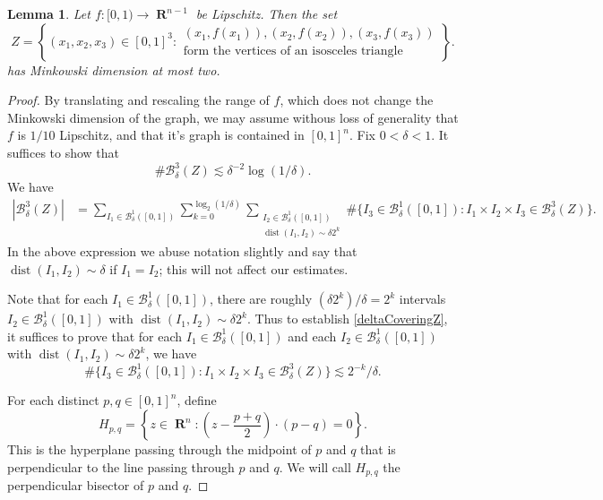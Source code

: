 \documentclass[dvipsnames,letterpaper,12pt]{article}
\numberwithin{equation}{section}
\theoremstyle{plain}
\newtheorem{lemma}{Lemma}
\theoremstyle{remark}
\DeclareMathOperator{\RR}{\mathbf{R}}
\begin{document}
\begin{lemma}
	Let $f\colon [0,1) \to \RR^{n-1}$ be Lipschitz. Then the set
	\[ Z = \left\{ (x_1,x_2,x_3) \in [0,1]^3\colon \begin{array}{c} (x_1,f(x_1)), (x_2,f(x_2)), (x_3,f(x_3))\\
		\textrm{form the vertices of an isosceles triangle} \end{array} \right\}. \]
	has Minkowski dimension at most two.
\end{lemma}
\begin{proof}
By translating and rescaling the range of $f$, which does not change the Minkowski dimension of the graph, we may assume withous loss of generality that $f$ is $1/10$ Lipschitz, and that it's graph is contained in $[0,1]^n$. Fix $0<\delta<1$. It suffices to show that
	\begin{equation}\label{deltaCoveringZ}
		\# \mathcal{B}_{\delta}^{3}(Z)\lesssim\delta^{-2}\log(1/\delta).
	\end{equation}
	We have
	\begin{align*}
		|\mathcal{B}_{\delta}^{3}(Z)| &= \sum_{I_1 \in \mathcal{B}_{\delta}^1([0,1])} \sum_{k=0}^{\log_2(1/\delta)} \sum_{\substack{I_2 \in \mathcal{B}_{\delta}^1([0,1]) \\ \operatorname{dist}(I_1,I_2)\sim \delta 2^k }} \#\{ I_3\in \mathcal{B}_{\delta}^1([0,1])\colon  I_1\times I_2\times I_3\in \mathcal{B}_{\delta}^{3}(Z) \}.
	\end{align*}
	In the above expression we abuse notation slightly and say that $\operatorname{dist}(I_1,I_2)\sim \delta$ if $I_1=I_2$; this will not affect our estimates.

Note that for each $I_1 \in \mathcal{B}_{\delta}^1([0,1])$, there are roughly $(\delta 2^k)/\delta=2^k$ intervals $I_2\in  \mathcal{B}_{\delta}^1([0,1])$ with $\operatorname{dist}(I_1,I_2)\sim \delta 2^k$. Thus to establish \eqref{deltaCoveringZ}, it suffices to prove that for each $I_1 \in \mathcal{B}_{\delta}^1([0,1])$ and each $I_2\in  \mathcal{B}_{\delta}^1([0,1])$ with $\operatorname{dist}(I_1,I_2)\sim \delta 2^k$, we have
\begin{equation}\label{numberOfI3}
\#\{ I_3\in \mathcal{B}_{\delta}^1([0,1])\colon  I_1\times I_2\times I_3\in \mathcal{B}_{\delta}^{3}(Z) \}\lesssim 2^{-k}/\delta.
\end{equation}

For each distinct $p,q\in [0,1]^n$, define 
%
\[ H_{p,q}= \left\{z\in \RR^n\colon \left(z-\frac{p+q}{2}\right)\cdot (p-q)=0  \right\}. \]
%
This is the hyperplane passing through the midpoint of $p$ and $q$ that is perpendicular to the line passing through $p$ and $q$. We will call $H_{p,q}$ the perpendicular bisector of $p$ and $q$.


\end{proof}
\end{document}
